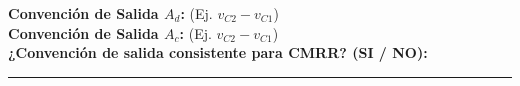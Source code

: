 \documentclass[11pt, a4paper]{article}
\begin{document}
\vspace{0.5cm}
\begin{tcolorbox}[colback=yellow!10, colframe=orange, title=\textbf{Registro de Convención (Auditoría de Consistencia)[cite: 5]}]
    \textbf{Convención de Salida $A_d$:} \hrulefill (Ej. $v_{C2} - v_{C1}$) \\[0.2cm]
    \textbf{Convención de Salida $A_c$:} \hrulefill (Ej. $v_{C2} - v_{C1}$) \\[0.2cm]
    \textbf{¿Convención de salida consistente para CMRR? (SI / NO):} \rule{2cm}{0.15mm}
\end{tcolorbox}
\end{document}
